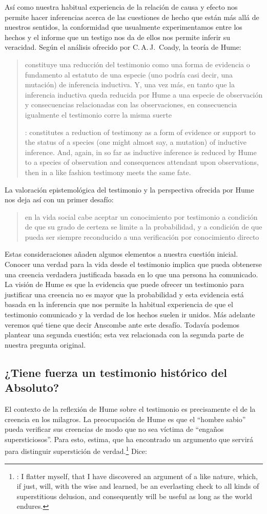 Así como nuestra habitual experiencia de la relación de causa y efecto nos
permite hacer inferencias acerca de las cuestiones de hecho que están más allá
de nuestros sentidos, la conformidad que usualmente experimentamos entre los
hechos y el informe que un testigo nos da de ellos nos permite inferir su
veracidad. Según el análisis ofrecido por C.\,A.\,J.~Coady, la teoría de Hume:
\blockquote[{\cite[79]{coady1992test}}: constitutes a reduction of testimony as
a form of evidence or support to the status of a species (one might almost say,
a mutation) of inductive inference. And, again, in so far as inductive inference
is reduced by Hume to a species of observation and consequences attendant upon
observations, then in a like fashion testimony meets the same fate.]{constituye
  una reducción del testimonio como una forma de evidencia o fundamento al
  estatuto de una especie (uno podría casi decir, una mutación) de inferencia
  inductiva. Y, una vez más, en tanto que la inferencia inductiva queda reducida
  por Hume a una especie de observación y consecuencias relacionadas con las
  observaciones, en consecuencia igualmente el testimonio corre la misma suerte}
La valoración epistemológica del testimonio y la perspectiva ofrecida por Hume
nos deja así con un primer desafío:
\blockquote[{\cite[294]{prades2015testimonio}}]{en la vida social cabe aceptar
  un conocimiento por testimonio a condición de que su grado de certeza se
  limite a la probabilidad, y a condición de que pueda ser siempre reconducido a
  una verificación por conocimiento directo}.

Estas consideraciones añaden algunos elementos a nuestra cuestión inicial.
Conocer una verdad para la vida desde el testimonio implica que pueda obtenerse
una creencia verdadera justificada basada en lo que una persona ha comunicado.
La visión de Hume es que la evidencia que puede ofrecer un testimonio para
justificar una creencia no es mayor que la probabilidad y esta evidencia está
basada en la inferencia que nos permite la habitual experiencia de que el
testimonio comunicado y la verdad de los hechos suelen ir unidos. Más adelante
veremos qué tiene que decir Anscombe ante este desafío. Todavía podemos plantear
una segunda cuestión; esta vez relacionada con la segunda parte de nuestra
pregunta original.

\subsection{¿Tiene fuerza un testimonio histórico del Absoluto?}
El contexto de la reflexión de Hume sobre el testimonio es precisamente el de la
  creencia en los milagros. La preocupación de Hume es que el \enquote{hombre
  sabio} pueda verificar sus creencias de modo que no sea víctima de
\enquote{engaños supersticiosos}. Para esto, estima, que ha encontrado un
argumento que servirá para distinguir superstición de
verdad.\footnote{\cite[\S10,1. 73]{hume1777enquiry}: I flatter myself, that I
  have discovered an argument of a like nature, which, if just, will, with the
  wise and learned, be an everlasting check to all kinds of superstitious
  delusion, and consequently will be useful as long as the world endures.} Dice:

